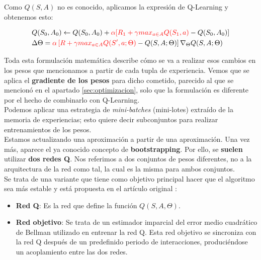 \documentclass[11pt,fleqn]{book} %
\begin{document}
Como $Q(S,A)$ no es conocido, aplicamos la expresión de Q-Learning y obtenemos esto:

\begin{align}
\begin{split}
&Q(S_0,A_0) \leftarrow Q(S_0,A_0)+\color{red}\alpha[R_1+\gamma max_{a \in A}Q(S_1,a)\color{black}-Q(S_0,A_0)]\\
&\Delta\Theta=\color{red}\alpha\left[R+\gamma max_{a \in A} Q(S',a;\Theta)\color{black}-Q(S,A;\Theta)\right]\color{black}\nabla_\Theta Q(S,A;\Theta) 
\end{split}
\end{align}

Toda esta formulación matemática describe cómo se va a realizar esos cambios en los pesos que mencionamos a partir de cada tupla de experiencia. Vemos que se aplica el \textbf{gradiente de los pesos} para dicho cometido, parecido al que se mencionó en el apartado \ref{sec:optimizacion}, solo que la formulación es diferente por el hecho de combinarlo con Q-Learning.\\

Podemos aplicar una estrategia de \textit{mini-batches} (mini-lotes) extraído de la memoria de experiencias; esto quiere decir subconjuntos para realizar entrenamientos de los pesos.  \\

Estamos actualizando una aproximación a partir de una aproximación. Una vez más, aparece el ya conocido concepto de \textbf{bootstrapping}. Por ello, se \textbf{suelen} utilizar \textbf{dos redes Q}. Nos referimos a dos conjuntos de pesos diferentes, no a la arquitectura de la red como tal, la cual es la misma para ambos conjuntos. \\

Se trata de una variante que tiene como objetivo principal hacer que el algoritmo sea más estable y está propuesta en el artículo original \cite{article:DQN}: \\

\begin{itemize}
	\item \textbf{Red Q}: Es la red que define la función $Q(S,A,\Theta)$.\\
	
	\item \textbf{Red objetivo}: Se trata de un estimador imparcial del error medio cuadrático de Bellman utilizado en entrenar la red Q. Esta red objetivo se sincroniza con la red Q después de un predefinido periodo de interacciones, produciéndose un acoplamiento entre las dos redes. 
\end{itemize}
\end{document}
